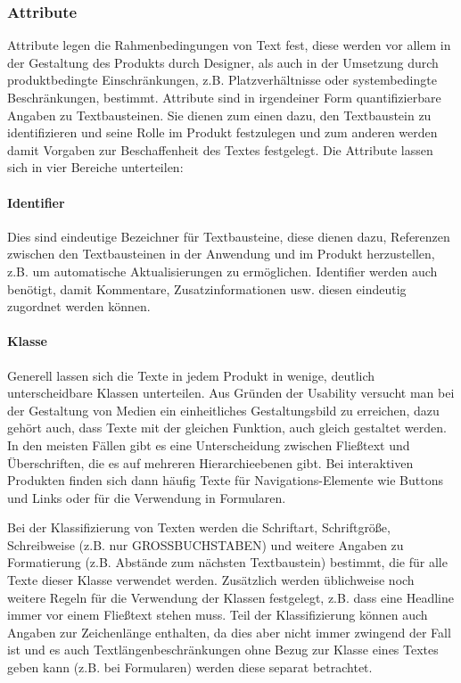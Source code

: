 \subsubsection{Attribute} 

Attribute legen die Rahmenbedingungen von Text fest, diese werden vor allem in der Gestaltung des Produkts durch Designer, als auch in der Umsetzung durch produktbedingte Einschränkungen, z.B. Platzverhältnisse oder systembedingte Beschränkungen, bestimmt. Attribute sind in irgendeiner Form quantifizierbare Angaben zu Textbausteinen. Sie dienen zum einen dazu, den Textbaustein zu identifizieren und seine Rolle im Produkt festzulegen und zum anderen werden damit Vorgaben zur Beschaffenheit des Textes festgelegt. Die Attribute lassen sich in vier Bereiche unterteilen:

\paragraph{Identifier} Dies sind eindeutige Bezeichner für Textbausteine, diese dienen dazu, Referenzen zwischen den Textbausteinen in der Anwendung und im Produkt herzustellen, z.B. um automatische Aktualisierungen zu ermöglichen. Identifier werden auch benötigt, damit Kommentare, Zusatzinformationen usw. diesen eindeutig zugordnet werden können.

\paragraph{Klasse} Generell lassen sich die Texte in jedem Produkt in wenige, deutlich unterscheidbare Klassen unterteilen. Aus Gründen der Usability versucht man bei der Gestaltung von Medien ein einheitliches Gestaltungsbild zu erreichen, dazu gehört auch, dass Texte mit der gleichen Funktion, auch gleich gestaltet werden. In den meisten Fällen gibt es eine Unterscheidung zwischen Fließtext und Überschriften, die es auf mehreren Hierarchieebenen gibt. Bei interaktiven Produkten finden sich dann häufig Texte für Navigations-Elemente wie Buttons und Links oder für die Verwendung in Formularen. 

Bei der Klassifizierung von Texten werden die Schriftart, Schriftgröße, Schreibweise  (z.B. nur GROSSBUCHSTABEN) und weitere Angaben zu Formatierung (z.B. Abstände zum nächsten Textbaustein) bestimmt, die für alle Texte dieser Klasse verwendet werden. Zusätzlich werden üblichweise noch weitere Regeln für die Verwendung der Klassen festgelegt, z.B. dass eine Headline immer vor einem Fließtext stehen muss. Teil der Klassifizierung können auch Angaben zur Zeichenlänge enthalten, da dies aber nicht immer zwingend der Fall ist und es auch Textlängenbeschränkungen ohne Bezug zur Klasse eines Textes geben kann (z.B. bei Formularen) werden diese separat betrachtet.

